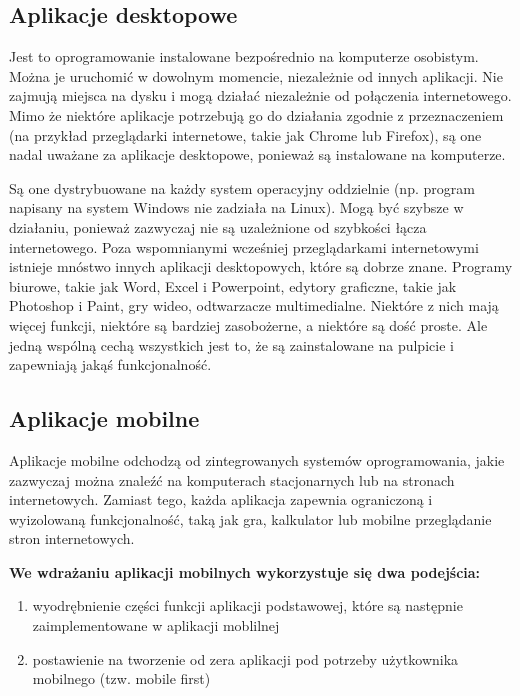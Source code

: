 \subsection{Aplikacje desktopowe}

Jest to oprogramowanie instalowane bezpośrednio na komputerze osobistym. Można je uruchomić w dowolnym momencie, niezależnie od innych aplikacji. Nie zajmują miejsca na dysku i mogą działać niezależnie od połączenia internetowego. Mimo że niektóre aplikacje potrzebują go do działania zgodnie z przeznaczeniem (na przykład przeglądarki internetowe, takie jak Chrome lub Firefox), są one nadal uważane za aplikacje desktopowe, ponieważ są instalowane na komputerze.

Są one dystrybuowane na każdy system operacyjny oddzielnie (np. program napisany na system Windows nie zadziała na Linux). Mogą być szybsze w działaniu, ponieważ zazwyczaj nie są uzależnione od szybkości łącza internetowego. Poza wspomnianymi wcześniej przeglądarkami internetowymi istnieje mnóstwo innych aplikacji desktopowych, które są dobrze znane. Programy biurowe, takie jak Word, Excel i Powerpoint, edytory graficzne, takie jak Photoshop i Paint, gry wideo, odtwarzacze multimedialne. Niektóre z nich mają więcej funkcji, niektóre są bardziej zasobożerne, a niektóre są dość proste. Ale jedną wspólną cechą wszystkich jest to, że są zainstalowane na pulpicie i zapewniają jakąś funkcjonalność.

\subsection{Aplikacje mobilne}
Aplikacje mobilne odchodzą od zintegrowanych systemów oprogramowania, jakie zazwyczaj można znaleźć na komputerach stacjonarnych lub na stronach internetowych. Zamiast tego, każda aplikacja zapewnia ograniczoną i wyizolowaną funkcjonalność, taką jak gra, kalkulator lub mobilne przeglądanie stron internetowych.

\textbf{We wdrażaniu aplikacji mobilnych wykorzystuje się dwa podejścia:}

\begin{enumerate}
    \item wyodrębnienie części funkcji aplikacji podstawowej, które są następnie zaimplementowane w aplikacji moblilnej
    \item postawienie na tworzenie od zera aplikacji pod potrzeby użytkownika mobilnego (tzw. mobile first) 
\end{enumerate}

